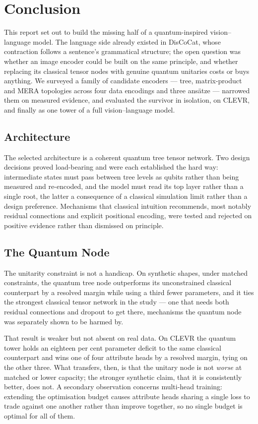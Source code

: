 \documentclass[12pt, a4paper, oneside]{report}
\begin{document}
\section{Conclusion}

This report set out to build the missing half of a quantum-inspired
vision--language model. The language side already existed in DisCoCat, whose
contraction follows a sentence's grammatical structure; the open question was
whether an image encoder could be built on the same principle, and whether
replacing its classical tensor nodes with genuine quantum unitaries costs or
buys anything. We surveyed a family of candidate encoders --- tree,
matrix-product and MERA topologies across four data encodings and three
ans\"{a}tze --- narrowed them on measured evidence, and evaluated the survivor
in isolation, on CLEVR, and finally as one tower of a full vision--language
model.

\subsection{Architecture}

The selected architecture is a coherent quantum tree tensor network. Two design
decisions proved load-bearing and were each established the hard way:
intermediate states must pass between tree levels as qubits rather than being
measured and re-encoded, and the model must read its top layer rather than a
single root, the latter a consequence of a classical simulation limit rather
than a design preference. Mechanisms that classical intuition recommends, most
notably residual connections and explicit positional encoding, were tested and
rejected on positive evidence rather than dismissed on principle.

\subsection{The Quantum Node}

The unitarity constraint is not a handicap. On synthetic shapes, under matched
constraints, the quantum tree node outperforms its unconstrained classical
counterpart by a resolved margin while using a third fewer parameters, and it
ties the strongest classical tensor network in the study --- one that needs
both residual connections and dropout to get there, mechanisms the quantum node
was separately shown to be harmed by.

That result is weaker but not absent on real data. On CLEVR the quantum tower
holds an eighteen per cent parameter deficit to the same classical counterpart
and wins one of four attribute heads by a resolved margin, tying on the other
three. What transfers, then, is that the unitary node is not \emph{worse} at
matched or lower capacity; the stronger synthetic claim, that it is
consistently better, does not. A secondary observation concerns multi-head
training: extending the optimisation budget causes attribute heads sharing a
single loss to trade against one another rather than improve together, so no
single budget is optimal for all of them.
\end{document}
